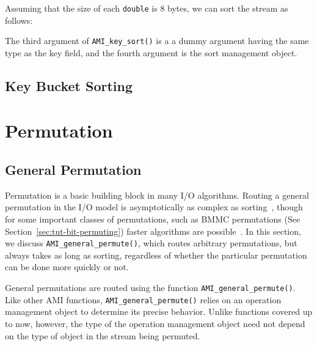 
 
Assuming that the size of each \lstinline|double| is 8 bytes, we can
sort the stream as follows:
 

 
The third argument of \lstinline|AMI_key_sort()| is a a dummy argument
having the same type as the key field, and the fourth argument is the
sort management object.




\subsection{Key Bucket Sorting}


\tobewritten{}


\section{Permutation}

\subsection{General Permutation}

Permutation is a basic building block in many I/O algorithms. Routing a
general permutation in the I/O model is asymptotically as complex as
sorting~\cite{aggarwal:input}, though for some important classes of
permutations, such as BMMC permutations (See
Section~\ref{sec:tut-bit-permuting}) faster algorithms are
possible~\cite{cormen:fast}. In this section, we discuss
\lstinline|AMI_general_permute()|, which routes arbitrary
permutations, but always takes as long as sorting, regardless of
whether the particular permutation can be done more quickly or not.

General permutations are routed using the function
\lstinline|AMI_general_permute()|.  Like other AMI functions,
\lstinline|AMI_general_permute()| relies on an operation management
object to determine its precise
behavior.  Unlike functions covered up to now, however, the type of
the operation management object
need not depend on the type of object in the stream being permuted.

